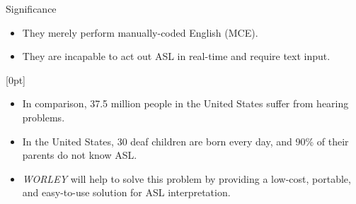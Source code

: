\documentclass[final, 16pt]{beamer}
\newlength{\colwidth}
\newlength{\twocolwidth}
\begin{document}
\begin{frame}[t]
\begin{columns}[t]
\begin{column}{\twocolwidth}
\begin{block}{Significance}
\begin{minipage}[t]{0.48\linewidth}
    \begin{itemize}
      \item They merely perform manually-coded English (MCE).
      \item They are incapable to act out ASL in real-time and require text input.
    \end{itemize}
    \end{minipage}\hfill%
    \begin{minipage}[t]{0.48\linewidth}
      [0pt]

      \begin{itemize}
        \item In comparison, 37.5 million people in the United States suffer from hearing problems.
        \item In the United States, 30 deaf children are born every day, and 90\% of their parents do not know ASL.
        \item \emph{WORLEY} will help to solve this problem by providing a low-cost, portable, and easy-to-use solution for ASL interpretation.
      \end{itemize}
    \end{minipage}
    
  
  \end{block}


\end{column}
\end{columns}
\end{frame}
\end{document}
